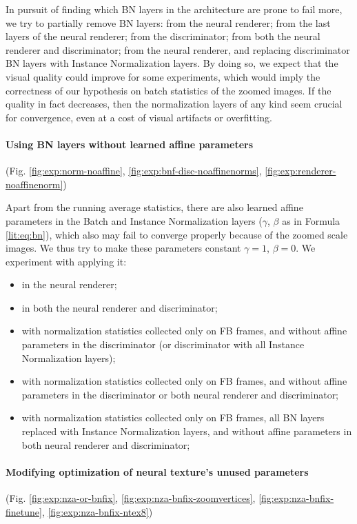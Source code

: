 In pursuit of finding which BN layers in the architecture are prone to fail more, we try to partially remove BN layers: from the neural renderer; from the last layers of the neural renderer; from the discriminator; from both the neural renderer and discriminator; from the neural renderer, and replacing discriminator BN layers with Instance Normalization layers. By doing so, we expect that the visual quality could improve for some experiments, which would imply the correctness of our hypothesis on batch statistics of the zoomed images. If the quality in fact decreases, then the normalization layers of any kind seem crucial for convergence, even at a cost of visual artifacts or overfitting.

\vspace{-15pt}\paragraph{Using BN layers without learned affine parameters}(Fig. \ref{fig:exp:norm-noaffine}, \ref{fig:exp:bnf-disc-noaffinenorms}, \ref{fig:exp:renderer-noaffinenorm})\mbox{}\nopagebreak

Apart from the running average statistics, there are also learned affine parameters in the Batch and Instance Normalization layers ($\gamma$, $\beta$ as in Formula \ref{lit:eq:bn}), which also may fail to converge properly because of the zoomed scale images. We thus try to make these parameters constant $\gamma=1$, $\beta=0$. We experiment with applying it:
\begin{itemize}
	\item in the neural renderer;
	\item in both the neural renderer and discriminator;
	\item with normalization statistics collected only on FB frames, and without affine parameters in the discriminator (or discriminator with all Instance Normalization layers);
	\item with normalization statistics collected only on FB frames, and without affine parameters in the discriminator or both neural renderer and discriminator;
	\item  with normalization statistics collected only on FB frames, all BN layers replaced with Instance Normalization layers, and without affine parameters in both neural renderer and discriminator;
\end{itemize}

\vspace{-15pt}\paragraph{Modifying optimization of neural texture's unused parameters}(Fig. \ref{fig:exp:nza-or-bnfix}, \ref{fig:exp:nza-bnfix-zoomvertices}, \ref{fig:exp:nza-bnfix-finetune}, \ref{fig:exp:nza-bnfix-ntex8})\mbox{}\nopagebreak

